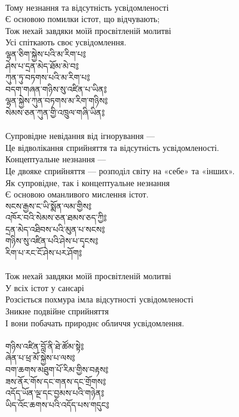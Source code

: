 \\
Тому незнання та відсутність усвідомленості \\
Є основою помилки істот, що відчувають; \\
Тож нехай завдяки моїй просвітленій молитві \\
Усі спіткають своє усвідомлення. \\
{\ti
ལྷན་ཅིག་སྐྱེས་པའི་མ་རིག་པ༔ \\
ཤེས་པ་དྲན་མེད་ཐོམ་མེ་བ༔ \\
ཀུན་ཏུ་བཏགས་པའི་མ་རིག་པ༔ \\
བདག་གཞན་གཉིས་སུ་འཛིན་པ་ཡིན༔ \\
ལྷན་སྐྱེས་ཀུན་བཏགས་མ་རིག་གཉིས༔ \\
སེམས་ཅན་ཀུན་གྱི་འཁྲུལ་གཞི་ཡིན༔}\\
\\
Супровідне невідання від ігнорування — \\
Це відволікання сприйняття та відсутність усвідомленості. \\
Концептуальне незнання — \\
Це двояке сприйняття — розподіл світу на «себе» та «інших». \\
Як супровідне, так і концептуальне незнання \\
Є основою оманливого мислення істот. \\
\newpage
{\ti
སངས་རྒྱས་ང་ཡི་སྨོན་ལམ་གྱིས༔ \\
འཁོར་བའི་སེམས་ཅན་ཐམས་ཅད་ཀྱི༔ \\
དྲན་མེད་འཐིབས་པའི་མུན་པ་སངས༔ \\
གཉིས་སུ་འཛིན་པའི་ཤེས་པ་དྭངས༔ \\
རིག་པ་རང་ངོ་ཤེས་པར་ཤོག༔}\\
\\
Тож нехай завдяки моїй просвітленій молитві \\
У всіх істот у сансарі \\
Розсіється похмура імла відсутності усвідомленості \\
Зникне подвійне сприйняття \\
І вони побачать природнє обличчя усвідомлення. \\
\\
{\ti
གཉིས་འཛིན་བློ་ནི་ཐེ་ཚོམ་སྟེ༔ \\
ཞེན་པ་ཕྲ་མོ་སྐྱེས་པ་ལས༔ \\
བག་ཆགས་མཐུག་པོ་རིམ་གྱིས་བརྟས༔ \\
ཟས་ནོར་གོས་དང་གནས་དང་གྲོགས༔ \\
འདོད་ཡོན་ལྔ་དང་བྱམས་པའི་གཉེན༔ \\
ཡིད་འོང་ཆགས་པའི་འདོད་པས་གདུང༔}\\
